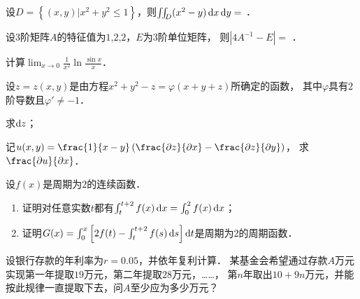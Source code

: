 \documentclass[plain,noanswer,medmath]{../../template/jnuexam}
\begin{document}
\begin{problem}
设$D = \left\{(x,y)|x^2 + y^2 \le 1 \right\}$，则$\iint_D (x^2 - y)\mathop{}\!\mathrm{d} x\mathop{}\!\mathrm{d} y =$ \fillin{}．
\end{problem}




\begin{problem}
设$3$阶矩阵$A$的特征值为$1$,$2$,$2$，$E$为$3$阶单位矩阵，
则$\left| 4A^{-1} - E \right| =$ \fillin{}．
\end{problem}






\begin{problem}[points=9]
计算$\lim_{x \to 0} \frac{1}{x^2}\ln \frac{\sin x}{x}$．
\end{problem}


\begin{problem}[points=10]
设$z = z$$(x,y)$是由方程$x^2 + y^2 - z = \varphi(x + y + z)$所确定的函数，
其中$\varphi$具有$2$阶导数且$\varphi' \ne -1$．\par
\begin{enumerate*}
\item 求$\mathop{}\!\mathrm{d} z$；
\item 记$u(x,y) = \frac{1}{x-y}\left(\frac{\pdz}{\pdx}-\frac{\pdz}{\pdy}\right)$，
      求$\frac{\pdu}{\pdx}$．
\end{enumerate*}
\end{problem}




\begin{problem}[points=10]%
设$f(x)$是周期为$2$的连续函数．
\begin{enumerate}
\item 证明对任意实数$t$都有$\int_t^{t + 2} f(x)\mathop{}\!\mathrm{d} x = \int_0^2 f(x)\mathop{}\!\mathrm{d} x$；
\item 证明$G(x) = \int_0^x \left[2f(t) - \int_t^{t + 2} f(s)\mathop{}\!\mathrm{d} s \right]\mathop{}\!\mathrm{d} t$是周期为$2$的周期函数．
\end{enumerate}
\end{problem}


\begin{problem}[points=10]
设银行存款的年利率为$r = 0.05$，并依年复利计算．
某基金会希望通过存款$A$万元实现第一年提取$19$万元，第二年提取$28$万元，……，
第$n$年取出$10 + 9n$万元，并能按此规律一直提取下去，问$A$至少应为多少万元？
\end{problem}








\end{document}
